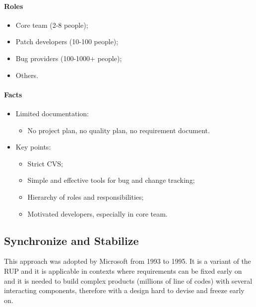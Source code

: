 \paragraph{Roles}
\begin{itemize}
\item Core team (2-8 people);
\item Patch developers (10-100 people);
\item Bug providers (100-1000+ people);
\item Others.
\end{itemize}

\paragraph{Facts}
\begin{itemize}
\item Limited documentation:
\begin{itemize}
\item No project plan, no quality plan, no requirement document.
\end{itemize}
\item Key points:
\begin{itemize}
\item Strict CVS;
\item Simple and effective tools for bug and change tracking;
\item Hierarchy of roles and responsibilities;
\item Motivated developers, especially in core team.
\end{itemize}
\end{itemize}

\subsection{Synchronize and Stabilize}
This approach was adopted by Microsoft from 1993 to 1995. It is a variant of the RUP and it is applicable in contexts where requirements can be fixed early on and it is needed to build complex products (millions of line of codes) with several interacting components, therefore with a design hard to devise and freeze early on.

